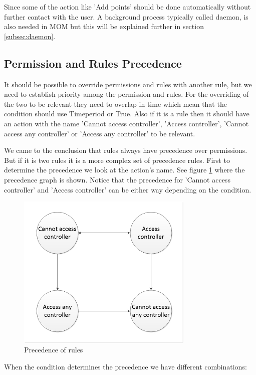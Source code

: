 Since some of the action like 'Add points' should be done automatically without further contact with the user. A background process typically called daemon, is also needed in MOM but this will be explained further in section \ref{subsec:daemon}. 


\subsection{Permission and Rules Precedence}
It should be possible to override permissions and rules with another rule, but we need to establish priority among the permission and rules. 
For the overriding of the two to be relevant they need to overlap in time which mean that the condition should use Timeperiod or True. Also if it is a rule then it should have an action with the name 'Cannot access controller', 'Access controller', 'Cannot access any controller' or 'Access any controller' to be relevant. 

We came to the conclusion that rules always have precedence over permissions. But if it is two rules it is a more complex set of precedence rules. First to determine the precedence we look at the action's name. See figure \ref{fig:precendence} where the precedence graph is shown. Notice that the precedence for 'Cannot access controller' and 'Access controller' can be either way depending on the condition. 
  
\begin{figure}
	\centering
		\includegraphics[width=0.75\textwidth]{images/precendence.jpg}
	\caption{Precedence of rules}
	\label{fig:precendence}
\end{figure}

When the condition determines the precedence we have different combinations:

